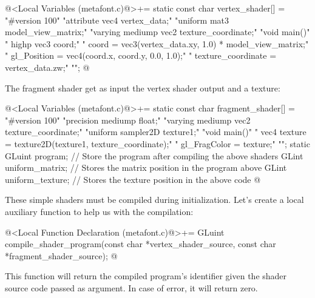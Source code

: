 {{{{{\iniciocodigo
@<Local Variables (metafont.c)@>+=
static const char vertex_shader[] =
  "#version 100\n"
  "attribute vec4 vertex_data;\n"
  "uniform mat3 model_view_matrix;\n"
  "varying mediump vec2 texture_coordinate;\n"
  "void main(){\n"
  "  highp vec3 coord;\n"
  "  coord = vec3(vertex_data.xy, 1.0) * model_view_matrix;\n"
  "  gl_Position = vec4(coord.x, coord.y, 0.0, 1.0);\n"
  "  texture_coordinate = vertex_data.zw;\n"
  "}\n";
@
\fimcodigo

The fragment shader get as input the vertex shader output and a
texture:

\iniciocodigo
@<Local Variables (metafont.c)@>+=
static const char fragment_shader[] =
  "#version 100\n"
  "precision mediump float;\n"
  "varying mediump vec2 texture_coordinate;\n"
  "uniform sampler2D texture1;\n"
  "void main(){\n"
  "  vec4 texture = texture2D(texture1, texture_coordinate);\n"
  "  gl_FragColor = texture;"
  "}\n";
static GLuint program; // Store the program after compiling the above shaders
GLint uniform_matrix; // Stores the matrix position in the program above
GLint uniform_texture; // Stores the texture position in the above code
@
\fimcodigo

These simple shaders must be compiled during initialization. Let's
create a local auxiliary function to help us with the compilation:

\iniciocodigo
@<Local Function Declaration (metafont.c)@>+=
GLuint compile_shader_program(const char *vertex_shader_source,
                              const char *fragment_shader_source);
@
\fimcodigo

This function will return the compiled program's identifier given the
shader source code passed as argument. In case of error, it will
return zero.

}}}}}
